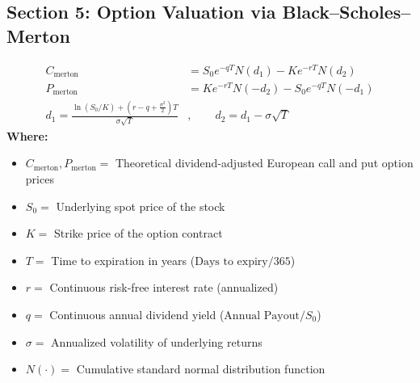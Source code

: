 \subsection*{Section 5: Option Valuation via Black--Scholes--Merton}

\begin{formulabox}
\begin{align*}
C_{\text{merton}} &= S_0 e^{-q T} N(d_1) - K e^{-r T} N(d_2) \\
P_{\text{merton}} &= K e^{-r T} N(-d_2) - S_0 e^{-q T} N(-d_1) \\
d_1 = \frac{\ln(S_0 / K) + \left(r - q + \frac{\sigma^2}{2}\right)T}{\sigma \sqrt{T}}&, \qquad d_2 = d_1 - \sigma \sqrt{T}
\end{align*}
\textbf{Where:}
\begin{itemize}[leftmargin=1.8em, noitemsep]
    \item $C_{\text{merton}}, P_{\text{merton}} =$ Theoretical dividend-adjusted European call and put option prices
    \item $S_0 =$ Underlying spot price of the stock
    \item $K =$ Strike price of the option contract
    \item $T =$ Time to expiration in years ($\text{Days to expiry} / 365$)
    \item $r =$ Continuous risk-free interest rate (annualized)
    \item $q =$ Continuous annual dividend yield ($\text{Annual Payout} / S_0$)
    \item $\sigma =$ Annualized volatility of underlying returns
    \item $N(\cdot) =$ Cumulative standard normal distribution function
\end{itemize}
\end{formulabox}

